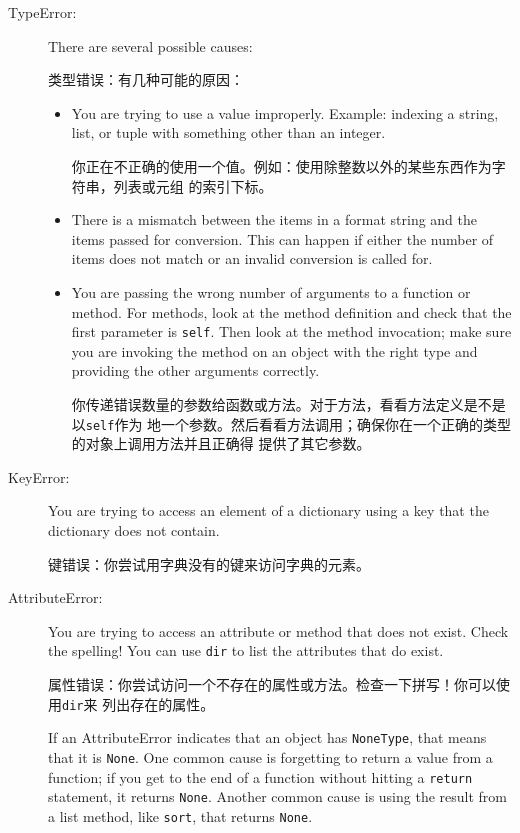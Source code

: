 \documentclass[10pt]{book}
\begin{document}
\begin{CJK}{UTF8}{gbsn}
\begin{description}
\item[TypeError:] There are several possible causes:

    类型错误：有几种可能的原因：

\begin{itemize}

\item  You are trying to use a value improperly.  Example: indexing
a string, list, or tuple with something other than an integer.

你正在不正确的使用一个值。例如：使用除整数以外的某些东西作为字符串，列表或元组
的索引下标。

\item There is a mismatch between the items in a format string and
the items passed for conversion.  This can happen if either the number
of items does not match or an invalid conversion is called for.


\item You are passing the wrong number of arguments to a function or method.
For methods, look at the method definition and
check that the first parameter is {\tt self}.  Then look at the
method invocation; make sure you are invoking the method on an
object with the right type and providing the other arguments
correctly.

你传递错误数量的参数给函数或方法。对于方法，看看方法定义是不是以{\tt self}作为
地一个参数。然后看看方法调用；确保你在一个正确的类型的对象上调用方法并且正确得
提供了其它参数。

\end{itemize}

\item[KeyError:]  You are trying to access an element of a dictionary
using a key that the dictionary does not contain.

键错误：你尝试用字典没有的键来访问字典的元素。

\item[AttributeError:] You are trying to access an attribute or method
that does not exist.  Check the spelling!  You can use
{\tt dir} to list the attributes that do exist.

属性错误：你尝试访问一个不存在的属性或方法。检查一下拼写！你可以使用{\tt dir}来
列出存在的属性。

If an AttributeError indicates that an object has {\tt NoneType},
that means that it is {\tt None}.  One common cause is forgetting
to return a value from a function; if you get to the end of
a function without hitting a {\tt return} statement, it returns
{\tt None}.  Another common cause is using the result from
a list method, like {\tt sort}, that returns {\tt None}.


\end{description}
\end{CJK}
\end{document}
